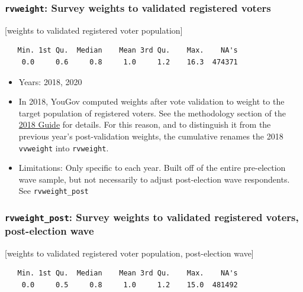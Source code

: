 \documentclass[10pt,article,oneside]{memoir}
\theoremstyle{definition}
\begin{document}
\hypertarget{rvweight-survey-weights-to-validated-registered-voters}{%
\subsubsection{\texorpdfstring{\texttt{rvweight}: Survey weights to
validated registered
voters}{rvweight: Survey weights to validated registered voters}}\label{rvweight-survey-weights-to-validated-registered-voters}}

{[}weights to validated registered voter population{]}

\begin{verbatim}
   Min. 1st Qu.  Median    Mean 3rd Qu.    Max.    NA's 
    0.0     0.6     0.8     1.0     1.2    16.3  474371 
\end{verbatim}

\begin{itemize}
\tightlist
\item
  Years: 2018, 2020
\item
  In 2018, YouGov computed weights after vote validation to weight to
  the target population of registered voters. See the methodology
  section of the \href{https://doi.org/10.7910/DVN/ZSBZ7K}{2018 Guide}
  for details. For this reason, and to distinguish it from the previous
  year's post-validation weights, the cumulative renames the 2018
  \texttt{vvweight} into \texttt{rvweight}.
\item
  Limitations: Only specific to each year. Built off of the entire
  pre-election wave sample, but not necessarily to adjust post-election
  wave respondents. See \texttt{rvweight\_post}
\end{itemize}

\hypertarget{rvweight_post-survey-weights-to-validated-registered-voters-post-election-wave}{%
\subsubsection{\texorpdfstring{\texttt{rvweight\_post}: Survey weights
to validated registered voters, post-election
wave}{rvweight\_post: Survey weights to validated registered voters, post-election wave}}\label{rvweight_post-survey-weights-to-validated-registered-voters-post-election-wave}}

{[}weights to validated registered voter population, post-election
wave{]}

\begin{verbatim}
   Min. 1st Qu.  Median    Mean 3rd Qu.    Max.    NA's 
    0.0     0.5     0.8     1.0     1.2    15.0  481492 
\end{verbatim}
\end{document}
